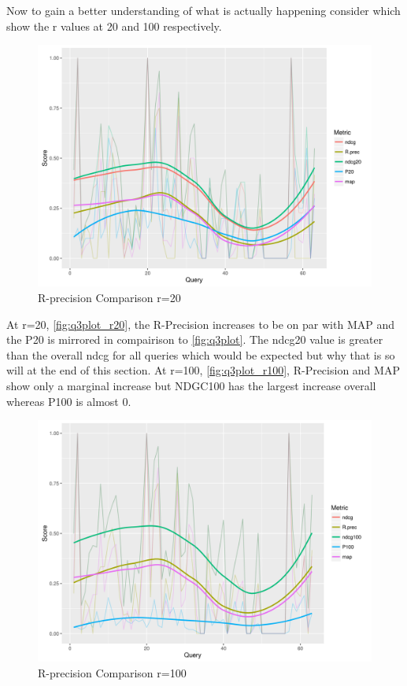 \documentclass[11pt]{article}
\begin{document}
Now to gain a better understanding of what is actually happening consider which show the r values at 20 and 100 respectively.
\begin{figure}[H]
\centering
\includegraphics[scale=0.7]{q3_plot_r20.png}
\caption{R-precision Comparison r=20} 
\label{fig:q3plot_r20}
\end{figure}
At r=20, \autoref{fig:q3plot_r20}, the R-Precision increases to be on par with MAP and the P20 is mirrored in compairison to \autoref{fig:q3plot}. The ndcg20 value is greater than the overall ndcg for all queries which would be expected but why that is so will at the end of this section. At r=100, \autoref{fig:q3plot_r100}, R-Precision and MAP show only a marginal increase but NDGC100 has the largest increase overall whereas P100 is almost 0. 
\begin{figure}[H]
\centering
\includegraphics[scale=0.7]{q3_plot_r100.png}
\caption{R-precision Comparison r=100}
\label{fig:q3plot_r100}
\end{figure}
\end{document}
